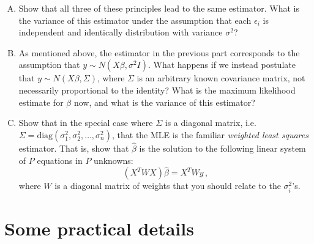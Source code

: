 \documentclass[11pt]{article}
\begin{document}
\begin{enumerate}[(A)]

\item Show that all three of these principles lead to the same estimator.  What is the variance of this estimator under the assumption that each $\epsilon_i$ is independent and identically distribution with variance $\sigma^2$?  

\item As mentioned above, the estimator in the previous part corresponds to the assumption that $y \sim N(X \beta, \sigma^2 I)$.  What happens if we instead postulate that $y \sim N(X \beta, \Sigma)$, where $\Sigma$ is an arbitrary known covariance matrix, not necessarily proportional to the identity?  What is the maximum likelihood estimate for $\beta$ now, and what is the variance of this estimator?   

\item Show that in the special case where $\Sigma$ is a diagonal matrix, i.e. $\Sigma = \mbox{diag}(\sigma_1^2, \sigma_2^2, \ldots, \sigma_n^2)$, that the MLE is the familiar \emph{weighted least squares} estimator.  That is, show that $\hat \beta$ is the solution to the following linear system of $P$ equations in $P$ unknowns:
$$
(X^T W X) \hat \beta = X^T W y \, ,
$$
where $W$ is a diagonal matrix of weights that you should relate to the $\sigma_i^2$'s.  

\end{enumerate}

\section{Some practical details}
\end{document}
